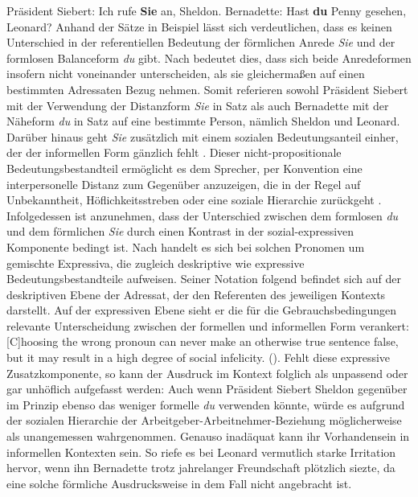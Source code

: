 \ea  \label{NäDi}
\ea Präsident Siebert: \glqq{}Ich rufe \textbf{Sie} an, Sheldon.\grqq{} \label{siebert3}
\ex Bernadette: \glqq{}Hast \textbf{du} Penny gesehen, Leonard?\grqq{} \label{bernadette3}
 \z
 \z
Anhand der Sätze in Beispiel  lässt sich verdeutlichen, dass es keinen Unterschied in der referentiellen Bedeutung der förmlichen Anrede \textit{Sie} und der formlosen Balanceform \textit{du} gibt. Nach \citet[33]{Loebner.2002} bedeutet dies, dass sich beide Anredeformen insofern nicht voneinander unterscheiden, als sie gleichermaßen auf einen bestimmten Adressaten Bezug nehmen. Somit referieren sowohl Präsident Siebert mit der Verwendung der Distanzform \textit{Sie} in Satz  als auch Bernadette mit der Näheform \textit{du} in Satz  auf eine bestimmte Person, nämlich Sheldon und Leonard. Darüber hinaus geht \textit{Sie} zusätzlich mit einem sozialen Bedeutungsanteil einher, der der informellen Form gänzlich fehlt \citep[vgl.][33]{Loebner.2002}. Dieser nicht-propositionale Bedeutungsbestandteil ermöglicht es dem Sprecher, per Konvention eine interpersonelle Distanz zum Gegenüber anzuzeigen, die in der Regel auf Unbekanntheit, Höflichkeitsstreben oder eine soziale Hierarchie zurückgeht \citep[vgl.][18]{Pafel.2016}. Infolgedessen ist anzunehmen, dass der Unterschied zwischen dem formlosen \textit{du} und dem förmlichen \textit{Sie} durch einen Kontrast in der sozial-expressiven Komponente bedingt ist. Nach {\citet[26]{Gutzmann.2019a}} handelt es sich bei solchen Pronomen um gemischte Expressiva, die zugleich deskriptive wie expressive Bedeutungsbestandteile aufweisen. Seiner Notation folgend befindet sich auf der deskriptiven Ebene der Adressat, der den Referenten des jeweiligen Kontexts darstellt. Auf der expressiven Ebene sieht er die für die Gebrauchsbedingungen relevante Unterscheidung zwischen der formellen und informellen Form verankert: \glqq{}[C]hoosing the wrong pronoun can never make an otherwise true sentence false, but it may result in a high degree of social infelicity.\grqq{} (\citealt[26]{Gutzmann.2019a}). Fehlt diese expressive Zusatzkomponente, so kann der Ausdruck im Kontext folglich als unpassend oder gar unhöflich aufgefasst werden: Auch wenn Präsident Siebert Sheldon gegenüber im Prinzip ebenso das weniger formelle \textit{du} verwenden könnte, würde es aufgrund der sozialen  Hierarchie der Arbeitgeber-Arbeitnehmer-Beziehung möglicherweise als unangemessen wahrgenommen. Genauso inadäquat kann ihr Vorhandensein in informellen Kontexten sein. So riefe es bei Leonard vermutlich starke Irritation hervor, wenn ihn Bernadette trotz jahrelanger Freundschaft plötzlich siezte, da eine solche förmliche Ausdrucksweise in dem Fall nicht angebracht ist.

